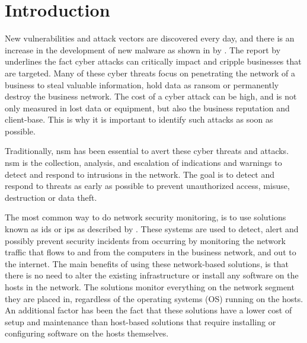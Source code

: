 \chapter{Introduction}
\label{chap:introduction}
New vulnerabilities and attack vectors are discovered every day, and there is an increase in the development of new malware as shown in  by \textcite{av_test_security_report_1819}. The report  by \textcite{m-trends_2020} underlines the fact cyber attacks can critically impact and cripple businesses that are targeted. Many of these cyber threats focus on penetrating the network of a business to steal valuable information, hold data as ransom or permanently destroy the business network. The cost of a cyber attack can be high, and is not only measured in lost data or equipment, but also the business reputation and client-base. This is why it is important to identify such attacks as soon as possible.

Traditionally, \acrfull{nsm} has been essential to avert these cyber threats and attacks. 
\acrshort{nsm} is the collection, analysis, and escalation of indications and warnings to detect and respond to intrusions in the network. The goal is to detect and respond to threats as early as possible to prevent unauthorized access, misuse, destruction or data theft.

The most common way to do network security monitoring, is to use solutions known as \acrfull{ids} or \acrfull{ips} as described by \textcite{liu_2019}. These systems are used to detect, alert and possibly prevent security incidents from occurring by monitoring the network traffic that flows to and from the computers in the business network, and out to the internet. The main benefits of using these network-based solutions, is that there is no need to alter the existing infrastructure or install any software on the hosts in the network. The solutions monitor everything on the network segment they are placed in, regardless of the operating systems (OS) running on the hosts. An additional factor has been the fact that these solutions have a lower cost of setup and maintenance than host-based solutions that require installing or configuring software on the hosts themselves.

